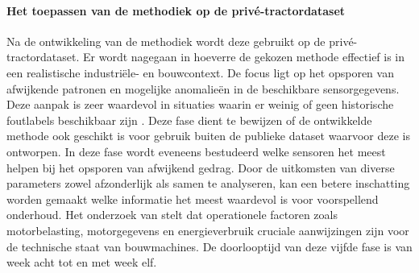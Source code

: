 \paragraph{Het toepassen van de methodiek op de privé-tractordataset}

Na de ontwikkeling van de methodiek wordt deze gebruikt op de privé-tracto\-rdataset. Er wordt nagegaan in hoeverre de gekozen methode effectief is in een realistische industri\-ële- en bouwcontext. De focus ligt op het opsporen van afwijkende patronen en mogelijke anomalieën in de beschikbare sensorgegevens. Deze aanpak is zeer waardevol in situaties waarin er weinig of geen historische foutlabels beschikbaar zijn \autocite{Giannoulidis2024}. Deze fase dient te bewijzen of de ontwikkelde methode ook geschikt is voor gebruik buiten de publieke dataset waarvoor deze is ontworpen. In deze fase wordt eveneens bestudeerd welke sensoren het meest helpen bij het opsporen van afwijkend gedrag. Door de uitkomsten van diverse parameters zowel afzonderlijk als samen te analyseren, kan een betere inschatting worden gemaakt welke informatie het meest waardevol is voor voorspellend onderhoud. Het onderzoek van \textcite{Mahale2025} stelt dat operationele factoren zoals motorbelasting, motorgegevens en energieverbruik cruciale aanwijzingen zijn voor de technische staat van bouwmachines. De doorlooptijd van deze vijfde fase is van week acht tot en met week elf.



